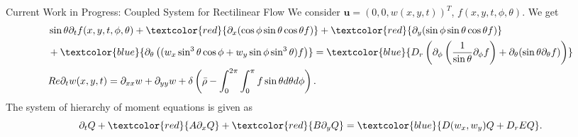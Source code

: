 \begin{frame}{Current Work in Progress: Coupled System for Rectilinear Flow}
	\scriptsize
We consider $\boldsymbol{u} = \left( 0, 0, w(x,y, t)\right)^T$, $f(x,y,t,\phi,\theta)$. We get
\begin{equation}
	\begin{aligned}
		&\sin\theta \partial_{t}f(x,y,t,\phi, \theta)+ \textcolor{red}{\partial_x(\cos\phi \sin\theta \cos\theta f)} + \textcolor{red}{\partial_y(\sin \phi \sin \theta \cos \theta f)} \\
		&+ \textcolor{blue}{\partial_\theta\left(( w_x \sin^3 \theta \cos \phi + w_y\sin \phi \sin^3 \theta) f\right)}
		= \textcolor{blue}{D_{r}\left( \partial_\phi \left(\frac{1}{\sin \theta} \partial_\phi f \right)+ \partial_\theta (\sin \theta \partial_\theta f)\right)} \\
		&Re\partial_{t}w(x,y,t) = \partial_{xx}w + \partial_{yy}w + \delta\left(\bar{\rho}-\int_{0}^{2\pi} \int_{0}^{\pi} f \sin \theta d\theta d\phi \right).
	\end{aligned}
\end{equation}
\pause
The system of hierarchy of moment equations is given as
	\begin{equation}
		\partial_t Q + \textcolor{red}{A  \partial_x Q}
		+ \textcolor{red}{B \partial_y Q} =  \textcolor{blue}{ D(w_x,w_y)Q+ D_rEQ}.
	\end{equation}
\end{frame}

